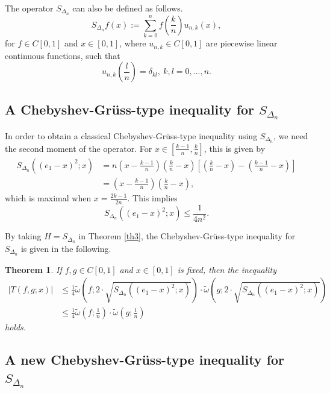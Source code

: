 \documentclass[12pt,leqno,a4paper,dvips,twoside]{article}
\newtheorem{thm}{Theorem}[section]
\begin{document}
{The operator $S_{\Delta_n}$ can also be defined as follows. 
	\begin{equation*}
		S_{\Delta_n}f(x):=\sum^{n}_{k=0}{f\left(\frac{k}{n}\right)u_{n,k}(x)},
	\end{equation*}
for $f\in C[0,1]$ and $x\in [0,1]$, where $u_{n,k}\in C[0,1]$ are piecewise linear continuous functions, such that
	\begin{equation*}
		u_{n,k}\left(\frac{l}{n}\right)=\delta_{kl},\ k,l=0,\ldots, n. 
	\end{equation*} 

\subsection{A Chebyshev-Gr\"{u}ss-type inequality for $S_{\Delta_n}$}
	
In order to obtain a classical Chebyshev-Gr\"{u}ss-type inequality using $S_{\Delta_n}$, we need the second moment of the operator.
For $x\in \left[\frac{k-1}{n},\frac{k}{n}\right]$, this is given by
	\begin{align*}
		S_{\Delta_n}((e_1-x)^2;x)&=n\left(x-\frac{k-1}{n}\right)\left(\frac{k}{n}-x\right)\left[\left(\frac{k}{n}-x\right)-\left(\frac{k-1}{n}-x\right)\right]\\
		&=\left(x-\frac{k-1}{n}\right)\left(\frac{k}{n}-x\right),
	\end{align*}
which is maximal when $x=\frac{2k-1}{2n}$. This implies
	\begin{equation*}
		S_{\Delta_n}((e_1-x)^2;x)\leq \frac{1}{4n^2}.
	\end{equation*}

By taking $H=S_{\Delta_n}$ in Theorem \ref{th3}, the Chebyshev-Gr\"{u}ss-type inequality for $S_{\Delta_n}$ is given in the following.

\begin{thm}
	If $f,g\in C[0,1]$ and $x\in [0,1]$ is fixed, then the inequality
	\begin{align*}
		\left|T(f,g;x)\right|&\leq \frac{1}{4}\widetilde{\omega}\left(f;2\cdot\sqrt{S_{\Delta_n}((e_1-x)^2;x)}\right)\cdot \widetilde{\omega}\left(g;2\cdot\sqrt{S_{\Delta_n}((e_1-x)^2;x)}\right)\\
		&\leq \frac{1}{4}\widetilde{\omega}\left(f;\frac{1}{n}\right)\cdot\widetilde{\omega}\left(g;\frac{1}{n}\right)
	\end{align*}
	holds. 
\end{thm}

\subsection{A new Chebyshev-Gr\"{u}ss-type inequality for $S_{\Delta_n}$}

}
\end{document}
